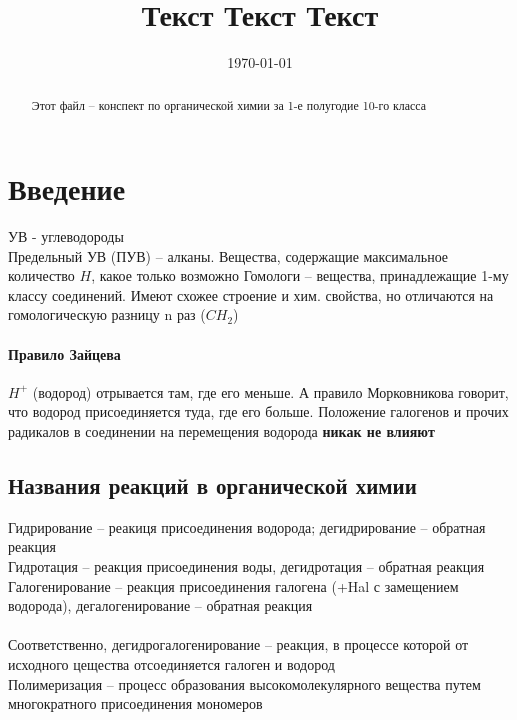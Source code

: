 \documentclass[a4paper]{article}
\title{Текст Текст Текст}
\date{\today}
\begin{document}
\maketitle
\tableofcontents
\begin{abstract}
Этот файл -- конспект по органической химии за 1-е полугодие 10-го класса
\end{abstract}
\section{Введение}
УВ - углеводороды\\
Предельный УВ (ПУВ) -- алканы. Вещества, содержащие максимальное
количество $H$, какое только возможно
Гомологи -- вещества, принадлежащие 1-му классу соединений. Имеют схожее
строение и хим. свойства, но отличаются на гомологическую разницу n раз
($CH_{2}$)\\
\paragraph{Правило Зайцева}
$H^{+}$ (водород) отрывается там, где его меньше. А правило Морковникова
говорит, что водород присоединяется туда, где его больше. Положение
галогенов и прочих радикалов в соединении на перемещения водорода
\textbf{никак не влияют}
\subsection{Названия реакций в органической химии}
Гидрирование -- реакиця присоединения водорода; дегидрирование -- обратная
реакция\\
Гидротация -- реакция присоединения воды, дегидротация -- обратная реакция\\
Галогенирование -- реакция присоединения галогена (+Hal с замещением водорода),
дегалогенирование -- обратная реакция\\\\
Соответственно, дегидрогалогенирование -- реакция, в процессе которой от
исходного цещества отсоединяется галоген и водород\\
Полимеризация -- процесс образования высокомолекулярного вещества путем
многократного присоединения мономеров\\
\end{document}
